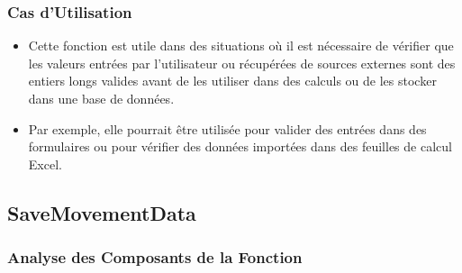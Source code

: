 \documentclass[a4paper, oneside, 12pt, final]{extreport}
\begin{document}
\subsubsection{Cas d'Utilisation}

\begin{itemize}
    \item Cette fonction est utile dans des situations où il est nécessaire de vérifier que les valeurs entrées par l'utilisateur ou récupérées de sources externes sont des entiers longs valides avant de les utiliser dans des calculs ou de les stocker dans une base de données.
    \item Par exemple, elle pourrait être utilisée pour valider des entrées dans des formulaires ou pour vérifier des données importées dans des feuilles de calcul Excel.
\end{itemize}
\subsection{SaveMovementData}

\subsubsection{Analyse des Composants de la Fonction}
\end{document}
